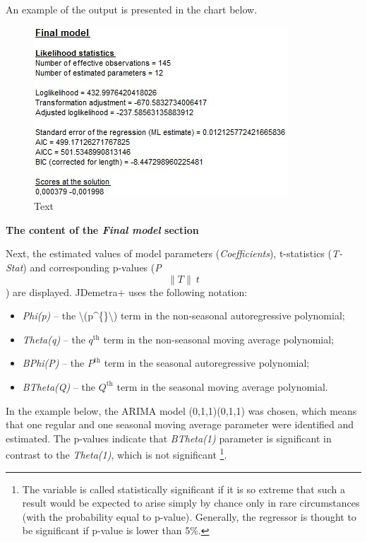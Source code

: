 \documentclass[
  letterpaper,
  DIV=11,
  numbers=noendperiod]{scrreprt}
\begin{document}
An example of the output is presented in the chart below.

\begin{figure}

{\centering \includegraphics{./All_images/image24_RMSB.jpg}

}

\caption{Text}

\end{figure}

\textbf{The content of the \emph{Final model} section}

Next, the estimated values of model parameters (\emph{Coefficients}),
t-statistics (\emph{T-Stat}) and corresponding p-values
(\emph{P}\[\|T\|\>t\]) are displayed. JDemetra+ uses the following
notation:

\begin{itemize}
\item
  \emph{Phi(p)} -- the \textbackslash(p\^{}\{\}\textbackslash)
  term in the non-seasonal autoregressive polynomial;
\item
  \emph{Theta(q)} -- the \(q^{\text{th}}\) term in the non-seasonal
  moving average polynomial;
\item
  \emph{BPhi(P)} -- the \(P^{\text{th}}\) term in the seasonal
  autoregressive polynomial;
\item
  \emph{BTheta(Q)} -- the \(Q^{\text{th}}\) term in the seasonal moving
  average polynomial.
\end{itemize}

In the example below, the ARIMA model (0,1,1)(0,1,1) was chosen, which
means that one regular and one seasonal moving average parameter were
identified and estimated. The p-values indicate that \emph{BTheta(1)}
parameter is significant in contrast to the \emph{Theta(1)}, which is
not significant \footnote{The variable is called statistically
  significant if it is so extreme that such a result would be expected
  to arise simply by chance only in rare circumstances (with the
  probability equal to p-value). Generally, the regressor is thought to
  be significant if p-value is lower than 5\%.}.
\end{document}
